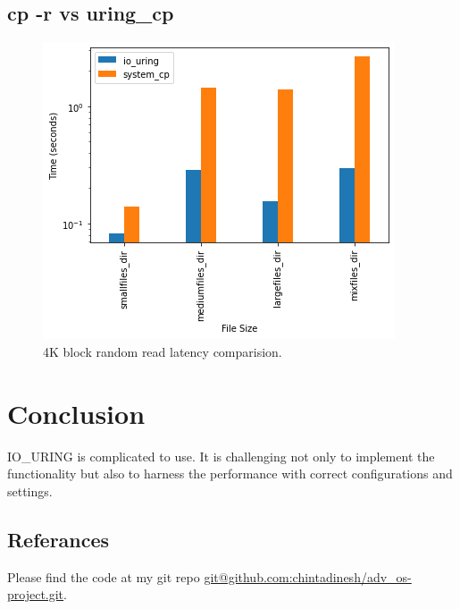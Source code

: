 \documentclass{article}
\begin{document}
\subsection{cp -r vs uring\_cp}

\begin{figure}
    \centering
    \includegraphics[scale = 0.5]{cp_perf_recursive_compare.png}
    \caption{4K block random read latency comparision.}
    \label{Figure7}
\end{figure}

\section{Conclusion}
IO\_URING is complicated to use. It is challenging not only to implement the functionality but also to harness 
the performance with correct configurations and settings.


\subsection{Referances}
Please find the code at my git repo \href{git@github.com:chintadinesh/adv\_os-project.git}{git@github.com:chintadinesh/adv\_os-project.git}.
\end{document}
